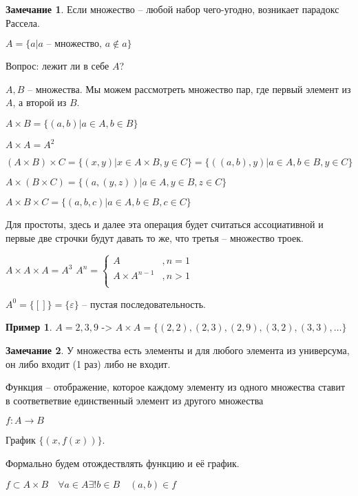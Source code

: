 \documentclass{book}
\theoremstyle{definition}
\newtheorem*{note}{Замечание}
\newtheorem*{example}{Пример}
\begin{document}
        \begin{note}
            Если множество -- любой набор чего-угодно, возникает парадокс Рассела.

            $A = \{a|a\text{ -- множество, } a\not\in a\}$
            
            Вопрос: лежит ли в себе $A$? 
        \end{note}

        \begin{definition}
            [Пара]

            $A, B$ -- множества. Мы можем рассмотреть множество пар, где первый элемент из $A$, а второй из $B$.

            $A \times B = \{(a,b) | a\in A, b\in B\}$

            $A\times A = A^2$
        \end{definition}

        $(A\times B)\times C = \{(x,y)|x\in A\times B, y\in C\} = \{((a,b),y) |a\in A, b\in B, y\in C\}$ 
   
        $A\times (B\times C) = \{(a,(y,z))| a\in A, y\in B, z\in C\}$
        
        $A\times B\times C = \{(a,b,c)|a\in A, b\in B, c\in C\}$

        Для простоты, здесь и далее эта операция будет считаться ассоциативной и первые две строчки будут давать то же, что третья -- множество троек.

        $A\times A\times A = A^3$
        $A^n = \begin{cases}
            A&,n=1\\
            A\times A^{n-1}&,n>1\\
        \end{cases}$

        $A^0 = \{[]\} = \{\varepsilon\}$ -- пустая последовательность.         
        \begin{example}
            $A = {2, 3, 9}$
->    
            $A\times A =\{(2,2),(2,3),(2,9),(3,2),(3,3),\ldots\}$ 
        \end{example}

        \begin{note}
            У множества есть элементы и для любого элемента из универсума, он либо входит (1 раз) либо не входит.
        \end{note}

        \begin{definition}
            Функция -- отображение, которое каждому элементу из одного множества ставит в соответветвие единственный элемент из другого множества

            $f:A\to B$ 

            График $\{(x,f(x))\}$.

            Формально будем отождествлять функцию и её график.

            $f\subset A\times B\quad \forall a\in A \exists ! b\in B\quad (a,b)\in f$
        \end{definition}
\end{document}

